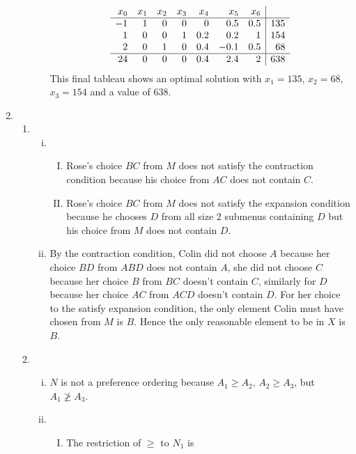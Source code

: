 \documentclass[10pt]{article}
\begin{document}
\begin{enumerate}
\begin{enumerate}
\begin{enumerate}[(i)]
          $$
          \begin{array}{rrrrrrr|r}
            x_0 & x_1 & x_2 & x_3 & x_4 & x_5 & x_6 \\
            \hline
            -1 & 1 & 0 & 0 & 0 & 0.5 & 0.5 & 135 \\
            1 & 0 & 0 & 1 & 0.2 & 0.2 & 1 & 154 \\
            2 & 0 & 1 & 0 & 0.4 & -0.1 & 0.5 & 68 \\
            \hline
            24 & 0 & 0 & 0 & 0.4 & 2.4 & 2 & 638 \\
          \end{array} \\
          $$
          This final tableau shows an optimal solution with $x_1 = 135$, $x_2 = 68$, $x_3 = 154$ and a value of 638.
      \end{enumerate}
      \pagebreak
    \end{enumerate}
      \item
      \begin{enumerate}
        \item
          \begin{enumerate}[(i)]
          \item 
            \begin{enumerate}[(I)]
            \item Rose's choice $BC$ from $M$ does not satisfy the contraction
              condition because his choice from $AC$ does not contain $C$.
            \item Rose's choice $BC$ from $M$ does not satisfy the expansion
              condition because he chooses $D$ from all size 2 submenus
                containing $D$ but his choice from $M$ does not contain $D$.
          \end{enumerate}
          \item By the contraction condition, Colin did not choose $A$ because
            her choice $BD$ from $ABD$ does not contain $A$, she did not choose $C$
              because her choice $B$ from $BC$ doesn't contain $C$, similarly for
              $D$ because her choice $AC$ from $ACD$ doesn't contain $D$. For her
              choice to the satisfy expansion condition, the only element Colin
              must have chosen from $M$ is $B$. Hence the only reasonable
              element to be in $X$ is $B$.
        \end{enumerate}
          \item 
            \begin{enumerate}[(i)]
              \item $N$ is not a preference ordering because $A_1 \geq A_2$,
                $A_2 \geq A_3$, but $A_1 \not\geq A_3$.
                \item
                \begin{enumerate}[(I)]
                    \item The restriction of $\geq$ to $N_1$ is


\end{enumerate}
\end{enumerate}
\end{enumerate}
\end{enumerate}
\end{document}
